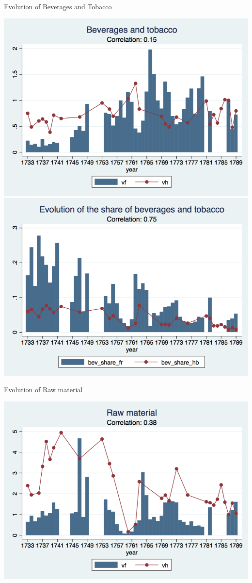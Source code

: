 \documentclass[12pt,a4paper,titlepage]{article}
\begin{document}
\caption{Evolution of Beverages and Tobacco}
\includegraphics[scale=.28]{bev_tobacco_long.png}
\includegraphics[scale=.28]{bev_tobacco_share.png}\\
\newpage
\caption{Evolution of Raw material}
\includegraphics[scale=.28]{raw_mat_long.png}
\end{document}
